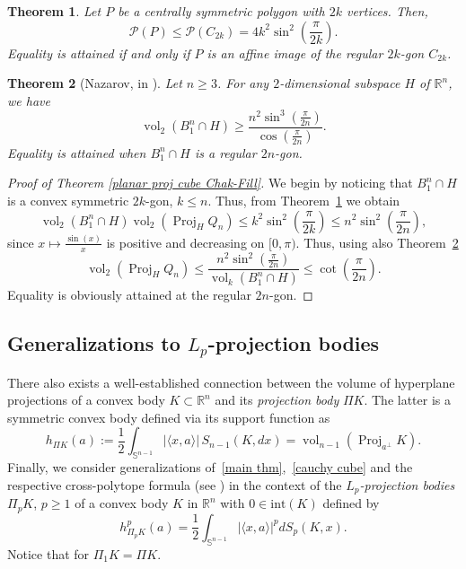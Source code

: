 \documentclass[10pt]{amsart}
\newcommand{\ls}{\leqslant}
\newcommand{\gr}{\geqslant}
\newcommand{\1}{\textbf{1}}
\numberwithin{equation}{section} %
\newtheorem{theorem}{Theorem}[section] %
\theoremstyle{remark}
\theoremstyle{definition}
\begin{document}
\begin{theorem}\label{mahler 2k-gon}\cite[Theorem 2]{meyer2011volume}
Let $P$ be a centrally symmetric polygon with $2k$ vertices. Then, $$\mathcal{P}(P)\ls \mathcal{P}(C_{2k})=4k^2\sin^2\left(\frac{\pi}{2k} \right).$$
 Equality is attained if and only if $P$ is an affine image of the regular $2k$-gon $C_{2k}$.
\end{theorem}

\begin{theorem}[Nazarov, in \cite{chasapis2022slicing}]\label{planar section cross}
Let  $n\gr3$. For any $2$-dimensional subspace $H$ of $\mathbb{R}^n$, we have 
\[
\operatorname{vol}_2(B_1^n\cap H)\gr\frac{n^2 \sin^3(\frac{\pi}{2n})}{\cos(\frac{\pi}{2n})}.
\]
Equality is attained when $B_1^n \cap H$ is a regular $2n$-gon.
\end{theorem}

\begin{proof}[Proof of Theorem \ref{planar proj cube Chak-Fill}]
We begin by noticing that $B_1^n\cap H$ is a convex symmetric $2k$-gon, $k\ls n$. Thus, from Theorem~\ref{mahler 2k-gon} we obtain 
\[
\operatorname{vol}_2(B_1^n\cap H)\operatorname{vol}_{2}(\operatorname{Proj}_{H}Q_n)\ls k^2\sin^2 \left(\frac{\pi}{2k} \right)\ls n^2\sin^2 \left(\frac{\pi}{2n}\right),
\]
since $x\mapsto\frac{\sin(x)}{x}$ is positive and decreasing  on $[0,\pi)$.
Thus, using also Theorem~\ref{planar section cross}
\[
\operatorname{vol}_{2}\left(\operatorname{Proj}_HQ_n \right)\ls \frac{n^2\sin^2 \left(\frac{\pi}{2n}\right)}{\operatorname{vol}_k(B_1^n\cap H)}\ls \cot\left(\frac{\pi}{2n}\right).
\]
Equality is obviously attained at the regular $2n$-gon.
\end{proof}





\subsection{Generalizations to $L_p$-projection bodies}
There also exists a well-established connection between the volume of hyperplane projections of a convex body $K \subset \mathbb{R}^n$ and its \emph{projection body} $\Pi K$. The latter is a symmetric convex body defined via its support function as
\[
h_{\Pi K}(a) := \frac{1}{2} \int_{\mathbb{S}^{n-1}} |\langle x, a \rangle| \, S_{n-1}(K, dx) 
= \operatorname{vol}_{n-1}(\operatorname{Proj}_{a^{\perp}} K).
\]
Finally, we consider generalizations of~\eqref{main thm},~\eqref{cauchy cube} and the respective cross-polytope formula (see \cite{nayar2023extremal})  in the context of the \emph{$L_p$-projection bodies} $\Pi_p K$, $p\gr1$  of a convex body $K$ in $\mathbb{R}^n$ with $0\in \text{int}(K)$ defined by 
\[
h_{\Pi_pK}^p(a)=\frac{1}{2}\int_{\mathbb{S}^{n-1}}|\langle x,a \rangle|^{p}dS_{p}(K,x).
\]
Notice that for $\Pi_1K=\Pi K$. 
\end{document}
